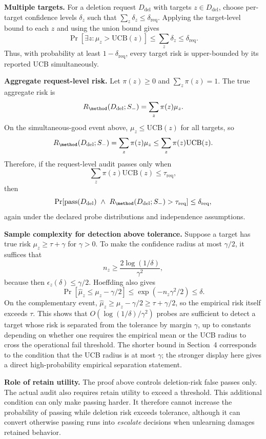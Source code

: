\textbf{Multiple targets.}
For a deletion request $D_{\mathrm{del}}$ with targets $z\in D_{\mathrm{del}}$, choose per-target confidence levels $\delta_z$ such that $\sum_z\delta_z\leq\delta_{\mathrm{req}}$. Applying the target-level bound to each $z$ and using the union bound gives
\[
\Pr[\exists z:\mu_z>\mathrm{UCB}(z)]\leq \sum_z\delta_z\leq\delta_{\mathrm{req}}.
\]
Thus, with probability at least $1-\delta_{\mathrm{req}}$, every target risk is upper-bounded by its reported UCB simultaneously.

\textbf{Aggregate request-level risk.}
Let $\pi(z)\geq0$ and $\sum_z\pi(z)=1$. The true aggregate risk is
\[
R_{\method}(D_{\mathrm{del}};S_-)=\sum_z \pi(z)\mu_z.
\]
On the simultaneous-good event above, $\mu_z\leq \mathrm{UCB}(z)$ for all targets, so
\[
R_{\method}(D_{\mathrm{del}};S_-)
=\sum_z\pi(z)\mu_z
\leq
\sum_z\pi(z)\mathrm{UCB}(z).
\]
Therefore, if the request-level audit passes only when
\[
\sum_z\pi(z)\mathrm{UCB}(z)\leq\tau_{\mathrm{req}},
\]
then
\[
\Pr[\mathrm{pass}(D_{\mathrm{del}})\ \wedge\ R_{\method}(D_{\mathrm{del}};S_-)>\tau_{\mathrm{req}}]
\leq \delta_{\mathrm{req}},
\]
again under the declared probe distributions and independence assumptions.

\textbf{Sample complexity for detection above tolerance.}
Suppose a target has true risk $\mu_z\geq\tau+\gamma$ for $\gamma>0$. To make the confidence radius at most $\gamma/2$, it suffices that
\[
n_z\geq \frac{2\log(1/\delta)}{\gamma^2},
\]
because then $\epsilon_z(\delta)\leq \gamma/2$. Hoeffding also gives
\[
\Pr[\hat\mu_z \leq \mu_z-\gamma/2]\leq \exp(-n_z\gamma^2/2)\leq\delta.
\]
On the complementary event, $\hat\mu_z\geq \mu_z-\gamma/2\geq\tau+\gamma/2$, so the empirical risk itself exceeds $\tau$. This shows that $O(\log(1/\delta)/\gamma^2)$ probes are sufficient to detect a target whose risk is separated from the tolerance by margin $\gamma$, up to constants depending on whether one requires the empirical mean or the UCB radius to cross the operational fail threshold. The shorter bound in Section~4 corresponds to the condition that the UCB radius is at most $\gamma$; the stronger display here gives a direct high-probability empirical separation statement.

\textbf{Role of retain utility.}
The proof above controls deletion-risk false passes only. The actual audit also requires retain utility to exceed a threshold. This additional condition can only make passing harder. It therefore cannot increase the probability of passing while deletion risk exceeds tolerance, although it can convert otherwise passing runs into \emph{escalate} decisions when unlearning damages retained behavior.

